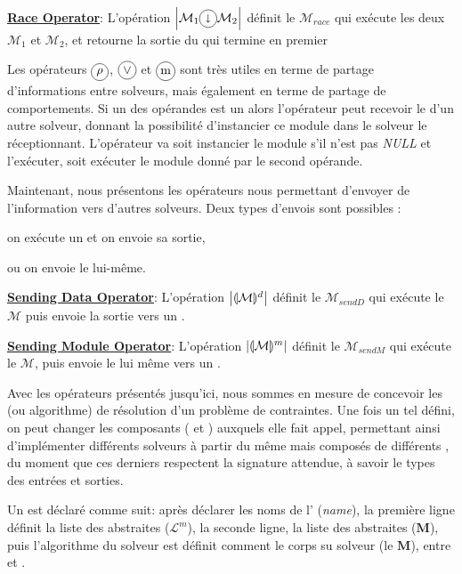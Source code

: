 \underline{\bf Race Operator}: L'opération $\left|\mathcal{M}_1\circled{$\shortdownarrow$}\mathcal{M}_2\right|$ définit le \infr{\cm{}} $\mathcal{M}_{race}$ qui exécute les deux \infr{\ms{}} $\mathcal{M}_1$ et $\mathcal{M}_2$, et retourne la sortie du \m{} qui termine en premier

Les opérateurs $\circled{$\rho$}$, $\circled{$\vee$}$ et $\circled{m}$ sont très  utiles en  terme de  partage d'informations entre   solveurs, mais également en terme de partage de comportements. Si un  des opérandes est un \infr{\opch{}} alors l'opérateur peut recevoir le \infr{\om{}} d'un autre solveur, donnant la possibilité d'instancier ce module dans le solveur le réceptionnant. L'opérateur va soit instancier le module s'il  n'est pas {\it NULL} et l'exécuter, soit exécuter le module donné par le second opérande.

Maintenant, nous présentons les opérateurs nous permettant d'envoyer de l'information vers d'autres solveurs. Deux types d'envois sont possibles :
\begin{inparaenum}[i)]
	\item on exécute un \infr{\m{}} et on envoie sa sortie,
	\item ou on envoie le \infr{\m{}} lui-même.
\end{inparaenum}

\underline{\bf Sending Data Operator}: L'opération $\left|\llparenthesis\mathcal{M}\rrparenthesis^d\right|$ définit le \infr{\cm{}} $\mathcal{M}_{sendD}$ qui exécute le \infr{\m{}} $\mathcal{M}$ puis envoie la sortie vers un \infr{\opch}.

\underline{\bf Sending Module Operator}: L'opération $\left|\llparenthesis\mathcal{M}\rrparenthesis^m\right|$ définit le \infr{\cm{}} $\mathcal{M}_{sendM}$ qui exécute le \infr{\m{}} $\mathcal{M}$, puis envoie le \infr{\m{}} lui même  vers un \infr{\opch}.

Avec  les opérateurs  présentés jusqu'ici, nous sommes  en mesure  de concevoir les \infr{\ass{}} (ou algorithme) de résolution d'un problème de contraintes. Une fois un tel \infr{\as{}} défini, on peut changer les composants (\infr{\oms{}} et \infr{\opchs}) auxquels elle fait appel, permettant ainsi d'implémenter différents solveurs à partir du même \as{} mais composés de différents \infr{\ms}, du moment que ces derniers respectent la signature attendue, à savoir le types des entrées et sorties.

Un \as{} est déclaré comme suit: après déclarer les noms de l'\mbox{\tet{\bf \as}} ({\it name}), la première ligne définit la liste des \infr{\oms{}} abstraites ($\mathcal{L}^m$), la seconde ligne, la liste des \infr{\opchs{}} abstraites ($\mathbf{M}$), puis l'algorithme du solveur est définit comment le corps su solveur (le  $\mathbf{M}$), entre \mbox{} et \mbox{}.

